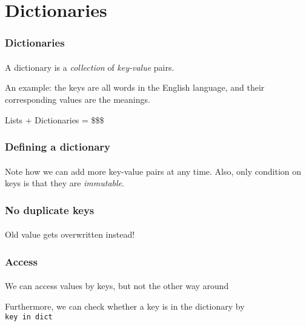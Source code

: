 \section{Dictionaries} %
\label{sec:dictionaries}

\begin{frame}\frametitle{Dictionaries}
    \framesubtitle{}

    A dictionary is a \emph{collection} of \emph{key-value} pairs.

    \vfill

    An example: the keys are all words in the English language, and their
    corresponding values are the meanings.

    \vfill

    Lists + Dictionaries = \$\$\$

\end{frame}

\begin{frame}\frametitle{Defining a dictionary}
    \framesubtitle{}


    Note how we can add more key-value pairs at any time.
    Also, only condition on keys is that they are \emph{immutable}.

\end{frame}

\begin{frame}\frametitle{No duplicate keys}
    \framesubtitle{}

    Old value gets overwritten instead!


\end{frame}

\begin{frame}\frametitle{Access}
    \framesubtitle{}

    We can access values by keys, but not the other way around


    \pause

    Furthermore, we can check whether a key is in the dictionary by\\
    \texttt{key in dict}

\end{frame}


